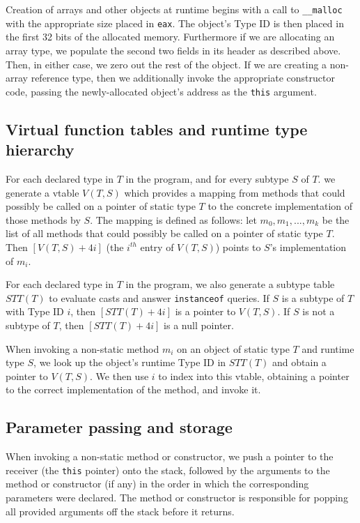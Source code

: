\documentclass[12pt]{article}
\newcommand{\code}[1]{\texttt{#1}}
\begin{document}
Creation of arrays and other objects at runtime begins with a call to \code{\_\_malloc} with the appropriate size placed in \code{eax}. The object's Type ID is then placed in the first 32 bits of the allocated memory. Furthermore if we are allocating an array type, we populate the second two fields in its header as described above. Then, in either case, we zero out the rest of the object. If we are creating a non-array reference type, then we additionally invoke the appropriate constructor code, passing the newly-allocated object's address as the \code{this} argument. 

\subsection{Virtual function tables and runtime type hierarchy}

For each declared type in $T$ in the program, and for every subtype $S$ of $T$. we generate a vtable $V(T,S)$ which provides a mapping from methods that could possibly be called on a pointer of static type $T$ to the concrete implementation of those methods by $S$. The mapping is defined as follows: let ${m_0,m_1,...,m_k}$ be the list of all methods that could possibly be called on a pointer of static type $T$. Then $[V(T,S)+4i]$ (the $i^{th}$ entry of $V(T,S)$) points to $S$'s implementation of $m_i$.

For each declared type in $T$ in the program, we also generate a subtype table $STT(T)$ to evaluate casts and answer \code{instanceof} queries. If $S$ is a subtype of $T$ with Type ID $i$, then $[STT(T)+4i]$ is a pointer to $V(T,S)$. If $S$ is not a subtype of $T$, then $[STT(T)+4i]$ is a null pointer.

When invoking a non-static method $m_i$ on an object of static type $T$ and runtime type $S$, we look up the object's runtime Type ID in $STT(T)$ and obtain a pointer to $V(T,S)$. We then use $i$ to index into this vtable, obtaining a pointer to the correct implementation of the method, and invoke it.

\subsection{Parameter passing and storage}

When invoking a non-static method or constructor, we push a pointer to the receiver (the \code{this} pointer) onto the stack, followed by the arguments to the method or constructor (if any) in the order in which the corresponding parameters were declared.  The method or constructor is responsible for popping all provided arguments off the stack before it returns.
\end{document}
